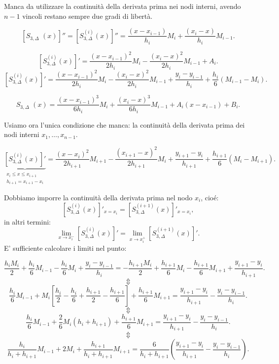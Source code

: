 Manca da utilizzare la continuità della derivata prima nei nodi interni, 
avendo $n-1$ vincoli restano sempre due gradi di libertà.

\[
\left[S_{3,\Delta}^{\phantom{(1)}}(x) \right]'' = 
\left[S_{3,\Delta}^{(i)}(x) \right]''
= \frac{(x-x_{i-1})}{h_i}M_i + \frac{(x_i-x)}{h_i}M_{i-1}.
\]

\[
\left[S_{3,\Delta}^{(i)}(x) \right]' = \frac{(x-x_{i-1})^2}{2h_i}M_i 
- \frac{(x_i-x)^2}{2h_i}M_{i-1} +A_i.
\]
\[
\left[S_{3,\Delta}^{(i)}(x) \right]' = \frac{(x-x_{i-1})^2}{2h_i}M_i 
- \frac{(x_i-x)^2}{2h_i}M_{i-1} + \frac{y_{i} -y_{i-1}}{h_i} + 
\frac{h_i}{6}\left(M_{i-1}-M_i\right).
\]

\[
S_{3,\Delta}^{\phantom{(1)}}(x) = \frac{(x-x_{i-1})^3}{6h_i}M_i +
\frac{(x_i-x)^3}{6h_i}M_{i-1} + A_i(x-x_{i-1}) + B_i.
\]

Usiamo ora l'unica condizione che manca: la continuità della derivata prima
dei nodi interni $x_1, \ldots, x_{n-1}$.

\[
\underbrace{\left[S_{3,\Delta}^{(i)}(x) \right]'}_{\substack{x_i \leq x \leq  x_{i+1} \\ 
h_{i+1} = x_{i+1}-x_i}} = \frac{(x-x_{i})^2}{2h_{i+1}}M_{i+1} 
- \frac{(x_{i+1}-x)^2}{2h_{i+1}}M_{i} + \frac{y_{i+1} -y_{i}}{h_{i+1}} + 
\frac{h_{i+1}}{6}\left(M_{i}-M_{i+1}\right).
\]

Dobbiamo imporre la continuità della derivata prima nel nodo $x_i$, cioé:
\[
\left[S_{3,\Delta}^{(i)}(x) \right]'_{x = x_i} = \left[S_{3,\Delta}^{(i+1)}(x) 
\right]'_{x=x_i},
\]
in altri termini:
\[
\lim_{x \to x_i^-} \left[S_{3,\Delta}^{(i)}(x) \right]' =
\lim_{x \to x_i^+} \left[S_{3,\Delta}^{(i+1)}(x) \right]'.
\]
E' sufficiente calcolare i limiti nel punto:

\[
\frac{h_iM_i}{2} + \frac{h_{i}}{6}M_{i-1} - \frac{h_{i}}{6}M_{i} +
\frac{y_{i} -y_{i-1}}{h_i} = -
\frac{h_{i+1}M_i}{2} + \frac{h_{i+1}}{6}M_{i} - \frac{h_{i+1}}{6}M_{i+1} +
\frac{y_{i+1} -y_{i}}{h_{i+1}}.
\]
\[\Updownarrow\]
\[
\frac{h_{i}}{6}M_{i-1} + M_i\left[\frac{h_i}{2} - \frac{h_{i}}{6} +
\frac{h_{i+1}}{2}  - \frac{h_{i+1}}{6}\right] + \frac{h_{i+1}}{6}M_{i+1} =
\frac{y_{i+1} -y_{i}}{h_{i+1}} - \frac{y_{i} -y_{i-1}}{h_{i}}.
\]
\[\Updownarrow\]
\[
\frac{h_{i}}{6}M_{i-1} + \frac{2}{6}M_i(h_i+h_{i+1}) + \frac{h_{i+1}}{6}M_{i+1} =
\frac{y_{i+1} -y_{i}}{h_{i+1}} - \frac{y_{i} -y_{i-1}}{h_{i}}.
\]
\[\Updownarrow\]
\[
\frac{h_{i}}{h_{i}+h_{i+1}}M_{i-1} + 2M_i + \frac{h_{i+1}}{h_{i}+h_{i+1}}M_{i+1} =
\frac{6}{h_{i}+h_{i+1}}\left(\frac{y_{i+1} -y_{i}}{h_{i+1}} - 
\frac{y_{i} -y_{i-1}}{h_{i}}\right).
\]


